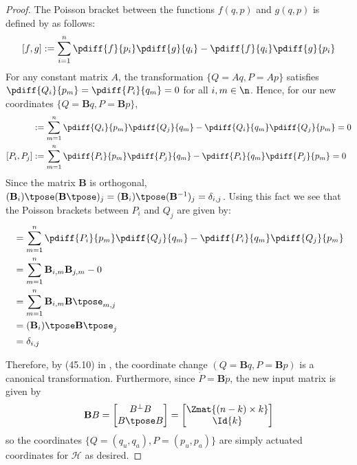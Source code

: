 \begin{proof}
    The Poisson bracket between the functions \(f(q,p)\) and \(g(q,p)\) is defined by
    \cite{landau_mechanics} as follows:
    \[
        [f,g] := \sum \limits_{i=1}^n \pdiff{f}{p_i}\pdiff{g}{q_i} - 
                \pdiff{f}{q_i}\pdiff{g}{p_i}
    \]
    For any constant matrix \(A\), the transformation
    \(\{Q = Aq, P = Ap\}\) satisfies
    \(\pdiff{Q_i}{p_m} = \pdiff{P_i}{q_m} = 0\) for all 
    \(i,m \in \n\).
    Hence, for our new coordinates \(\{Q = \mathbf{B}q, P = \mathbf{B}p\}\),
    \begin{align*}
        [Q_i,Q_j] &:= \sum\limits_{m = 1}^n \pdiff{Q_i}{p_m}\pdiff{Q_j}{q_m} - 
        \pdiff{Q_i}{q_m}\pdiff{Q_j}{p_m} = 0 \\
        [P_i,P_j] &:= \sum\limits_{m=1}^n \pdiff{P_i}{p_m}\pdiff{P_j}{q_m} -
        \pdiff{P_i}{q_m}\pdiff{P_j}{p_m} = 0
    \end{align*}
    Since the matrix \(\mathbf{B}\) is orthogonal,
    \((\mathbf{B}_i)\tpose (\mathbf{B}\tpose)_j = (\mathbf{B}_i)\tpose (\mathbf{B}^{-1})_j = \delta_{i,j}\). Using this
    fact we see that the Poisson brackets between \(P_i\) and \(Q_j\) are given by:
    \begin{align*}
        [P_i,Q_j] &= \sum\limits_{m=1}^n\pdiff{P_i}{p_m}\pdiff{Q_j}{q_m}
        - \pdiff{P_i}{q_m}\pdiff{Q_j}{p_m} \\
                  &= \sum\limits_{m=1}^n \mathbf{B}_{i,m}\mathbf{B}_{j,m} - 0 \\
                  &= \sum\limits_{m=1}^n \mathbf{B}_{i,m}\mathbf{B}\tpose_{m,j} \\
                  &= (\mathbf{B}_i)\tpose \mathbf{B}\tpose_j \\
                  &= \delta_{i,j}
    \end{align*}

    Therefore, by (45.10) in \cite{landau_mechanics}, the coordinate change 
    \((Q = \mathbf{B}q, P = \mathbf{B}p)\) is a canonical transformation.
    Furthermore, since \(\dot{P} = \mathbf{B}\dot{p}\), the new input matrix is
    given by 
    \[
        \mathbf{B}B = \begin{bmatrix}
            B^\perp B \\
            B\tpose B \\
        \end{bmatrix} = 
        \begin{bmatrix}
            \Zmat{(n-k)\times k} \\
            \Id{k}
        \end{bmatrix}
    \]
    so the coordinates \(\{Q = (q_u,q_a), P = (p_u,p_a)\}\) are simply actuated coordinates for 
    \(\mathcal{H}\) as desired.
\end{proof}

